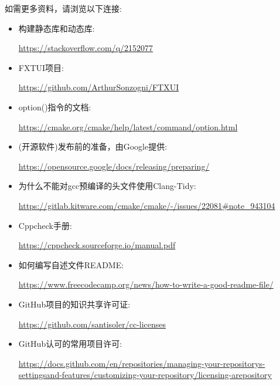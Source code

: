 如需更多资料，请浏览以下连接:

\begin{itemize}
\item 
构建静态库和动态库:

\url{https://stackoverflow.com/q/2152077}

\item 
FXTUI项目:

\url{https://github.com/ArthurSonzogni/FTXUI}

\item 
option()指令的文档: 

\url{https://cmake.org/cmake/help/latest/command/option.html}

\item 
(开源软件)发布前的准备，由Google提供:

\url{https://opensource.google/docs/releasing/preparing/}

\item 
为什么不能对gcc预编译的头文件使用Clang-Tidy:

\url{https://gitlab.kitware.com/cmake/cmake/-/issues/22081\#note\_943104}

\item 
Cppcheck手册:

\url{https://cppcheck.sourceforge.io/manual.pdf}

\item 
如何编写自述文件README:

\url{https://www.freecodecamp.org/news/how-to-write-a-good-readme-file/}

\item 
GitHub项目的知识共享许可证:

\url{https://github.com/santisoler/cc-licenses}

\item 
GitHub认可的常用项目许可:

\url{https://docs.github.com/en/repositories/managing-your-repositorys-settingsand-features/customizing-your-repository/licensing-arepository}
\end{itemize}